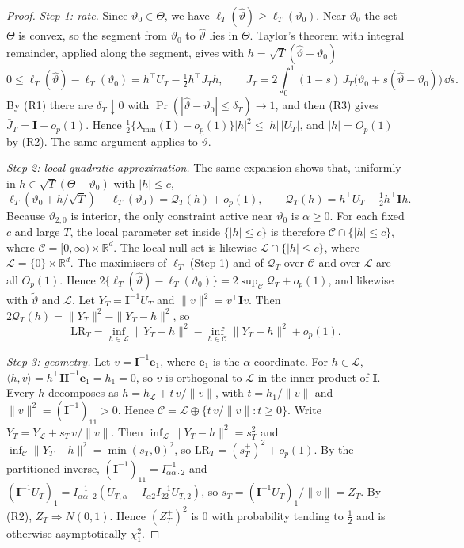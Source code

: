\begin{proof}
\emph{Step 1: rate.} Since $\vartheta_0\in\Theta$, we have
$\ell_T(\hat\vartheta)\ge\ell_T(\vartheta_0)$. Near $\vartheta_0$ the set $\Theta$ is
convex, so the segment from $\vartheta_0$ to $\hat\vartheta$ lies in $\Theta$. Taylor's
theorem with integral remainder, applied along the segment, gives with
$h=\sqrt T(\hat\vartheta-\vartheta_0)$
\[
  0\le\ell_T(\hat\vartheta)-\ell_T(\vartheta_0)=h^{\top}U_T-\tfrac12h^{\top}\bar J_Th,
  \qquad \bar J_T=2\int_0^1(1-s)\,J_T\big(\vartheta_0+s(\hat\vartheta-\vartheta_0)\big)\,\dd s .
\]
By (R1) there are $\delta_T\downarrow0$ with $\Pr(|\hat\vartheta-\vartheta_0|\le\delta_T)\to1$,
and then (R3) gives $\bar J_T=\bm I+o_p(1)$. Hence
$\tfrac12\{\lambda_{\min}(\bm I)-o_p(1)\}|h|^2\le|h|\,|U_T|$, and $|h|=O_p(1)$ by (R2). The
same argument applies to $\tilde\vartheta$.

\emph{Step 2: local quadratic approximation.} The same expansion shows that, uniformly in
$h\in\sqrt T(\Theta-\vartheta_0)$ with $|h|\le c$,
\[
  \ell_T(\vartheta_0+h/\sqrt T)-\ell_T(\vartheta_0)=\mathcal Q_T(h)+o_p(1),\qquad
  \mathcal Q_T(h)=h^{\top}U_T-\tfrac12h^{\top}\bm Ih .
\]
Because $\vartheta_{2,0}$ is interior, the only constraint active near $\vartheta_0$ is
$\alpha\ge0$. For each fixed $c$ and large $T$, the local parameter set inside
$\{|h|\le c\}$ is therefore $\mathcal C\cap\{|h|\le c\}$, where
$\mathcal C=[0,\infty)\times\mathbb R^d$. The local null set is likewise
$\mathcal L\cap\{|h|\le c\}$, where $\mathcal L=\{0\}\times\mathbb R^d$. The maximisers of
$\ell_T$ (Step 1) and of $\mathcal Q_T$ over $\mathcal C$ and over $\mathcal L$ are all $O_p(1)$.
Hence
$2\{\ell_T(\hat\vartheta)-\ell_T(\vartheta_0)\}=2\sup_{\mathcal C}\mathcal Q_T+o_p(1)$, and
likewise with $\tilde\vartheta$ and $\mathcal L$. Let $Y_T=\bm I^{-1}U_T$ and
$\|v\|^2=v^{\top}\bm Iv$. Then $2\mathcal Q_T(h)=\|Y_T\|^2-\|Y_T-h\|^2$, so
\[
  \mathrm{LR}_T=\inf_{h\in\mathcal L}\|Y_T-h\|^2-\inf_{h\in\mathcal C}\|Y_T-h\|^2+o_p(1).
\]

\emph{Step 3: geometry.} Let $v=\bm I^{-1}\bm e_1$, where $\bm e_1$ is the
$\alpha$-coordinate. For $h\in\mathcal L$, $\langle h,v\rangle=h^{\top}\bm I\bm I^{-1}\bm e_1=h_1=0$,
so $v$ is orthogonal to $\mathcal L$ in the inner product of $\bm I$. Every $h$
decomposes as $h=h_{\mathcal L}+t\,v/\|v\|$, with $t=h_1/\|v\|$ and
$\|v\|^2=(\bm I^{-1})_{11}>0$. Hence $\mathcal C=\mathcal L\oplus\{t\,v/\|v\|:t\ge0\}$.
Write $Y_T=Y_{\mathcal L}+s_T\,v/\|v\|$. Then
$\inf_{\mathcal L}\|Y_T-h\|^2=s_T^2$ and $\inf_{\mathcal C}\|Y_T-h\|^2=\min(s_T,0)^2$, so
$\mathrm{LR}_T=(s_T^+)^2+o_p(1)$. By the partitioned inverse,
$(\bm I^{-1})_{11}=I_{\alpha\alpha\cdot2}^{-1}$ and
$(\bm I^{-1}U_T)_1=I_{\alpha\alpha\cdot2}^{-1}(U_{T,\alpha}-I_{\alpha2}I_{22}^{-1}U_{T,2})$,
so $s_T=(\bm I^{-1}U_T)_1/\|v\|=Z_T$. By (R2), $Z_T\Rightarrow N(0,1)$. Hence
$(Z_T^+)^2$ is $0$ with probability tending to $\tfrac12$ and is otherwise asymptotically
$\chi^2_1$.


\end{proof}
